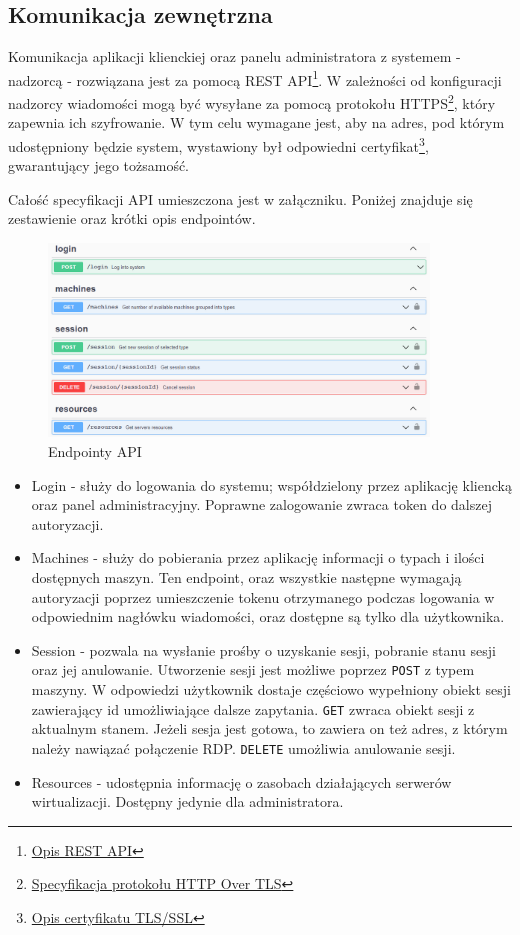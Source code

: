 \documentclass[../opis-rozwiazania.tex]{subfiles}
\begin{document}
\subsection{Komunikacja zewnętrzna}
\label{communication:api}
Komunikacja aplikacji klienckiej oraz panelu administratora z systemem - nadzorcą - rozwiązana jest za pomocą REST API\footnote{\href{https://restfulapi.net/}{Opis REST API}}. W zależności od konfiguracji nadzorcy wiadomości mogą być wysyłane za pomocą protokołu HTTPS\footnote{\href{https://datatracker.ietf.org/doc/html/rfc2818}{Specyfikacja protokołu HTTP Over TLS}}, który zapewnia ich szyfrowanie. W tym celu wymagane jest, aby na adres, pod którym udostępniony będzie system, wystawiony był odpowiedni certyfikat\footnote{\href{https://protonmail.com/blog/tls-ssl-certificate/}{Opis certyfikatu TLS/SSL}}, gwarantujący jego tożsamość.

Całość specyfikacji API umieszczona jest w załączniku. Poniżej znajduje się zestawienie oraz krótki opis endpointów.

\begin{figure}[H]
    \centering
    \includegraphics[width=0.9\textwidth]{../api/endpoints.png}
    \caption{Endpointy API}
\end{figure}

\begin{itemize}
    \item Login - służy do logowania do systemu; współdzielony przez aplikację kliencką oraz panel administracyjny. Poprawne zalogowanie zwraca token do dalszej autoryzacji.
    \item Machines - służy do pobierania przez aplikację informacji o typach i ilości dostępnych maszyn. Ten endpoint, oraz wszystkie następne wymagają autoryzacji poprzez umieszczenie tokenu otrzymanego podczas logowania w odpowiednim nagłówku wiadomości, oraz dostępne są tylko dla użytkownika.
    \item Session - pozwala na wysłanie prośby o uzyskanie sesji, pobranie stanu sesji oraz jej anulowanie. Utworzenie sesji jest możliwe poprzez \texttt{POST} z typem maszyny. W odpowiedzi użytkownik dostaje częściowo wypełniony obiekt sesji zawierający id umożliwiające dalsze zapytania. \texttt{GET} zwraca obiekt sesji z aktualnym stanem. Jeżeli sesja jest gotowa, to zawiera on też adres, z którym należy nawiązać połączenie RDP. \texttt{DELETE} umożliwia anulowanie sesji.
    \item Resources - udostępnia informację o zasobach działających serwerów wirtualizacji. Dostępny jedynie dla administratora.
\end{itemize}
\end{document}
